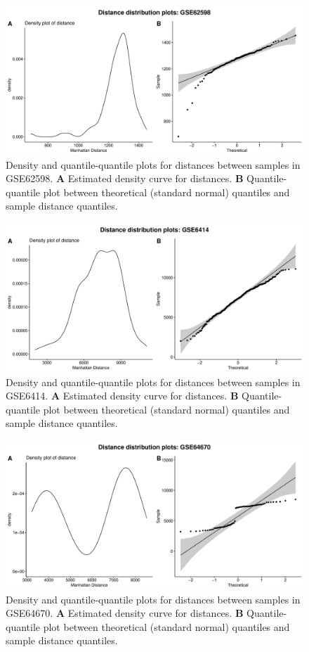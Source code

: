 \documentclass[10pt,letterpaper]{article}\usepackage[]{graphicx}\usepackage[]{color}
\begin{document}
\begin{figure}[H]
	\includegraphics[width=\textwidth]{manhattan-distance_hist_GSE62598.pdf}
	\caption{Density and quantile-quantile plots for distances between samples in GSE62598. \textbf{A} Estimated density curve for distances. \textbf{B} Quantile-quantile plot between theoretical (standard normal) quantiles and sample distance quantiles.}
\end{figure}

\begin{figure}[H]
	\includegraphics[width=\textwidth]{manhattan-distance_hist_GSE6414.pdf}
	\caption{Density and quantile-quantile plots for distances between samples in GSE6414. \textbf{A} Estimated density curve for distances. \textbf{B} Quantile-quantile plot between theoretical (standard normal) quantiles and sample distance quantiles.}
\end{figure}

\begin{figure}[H]
	\includegraphics[width=\textwidth]{manhattan-distance_hist_GSE64670.pdf}
	\caption{Density and quantile-quantile plots for distances between samples in GSE64670. \textbf{A} Estimated density curve for distances. \textbf{B} Quantile-quantile plot between theoretical (standard normal) quantiles and sample distance quantiles.}
\end{figure}
\end{document}
